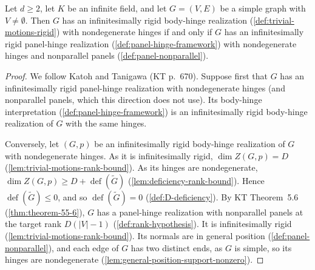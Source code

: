 \begin{theorem}
  \label{thm:molecular-conjecture}
  \leanok
  Let $d \ge 2$, let $K$ be an infinite field, and let $G = (V, E)$ be a
  simple graph with $V \neq \emptyset$. Then $G$ has an infinitesimally
  rigid body-hinge realization (\cref{def:trivial-motions-rigid}) with
  nondegenerate hinges if and only if $G$ has an infinitesimally rigid
  panel-hinge realization (\cref{def:panel-hinge-framework}) with
  nondegenerate hinges and nonparallel panels
  (\cref{def:panel-nonparallel}).
\end{theorem}
\begin{proof}
  \leanok
  We follow Katoh and Tanigawa (KT p.~670). Suppose first that $G$ has an
  infinitesimally rigid panel-hinge realization with nondegenerate hinges
  (and nonparallel panels, which this direction does not use).
  Its body-hinge interpretation (\cref{def:panel-hinge-framework}) is an
  infinitesimally rigid body-hinge realization of $G$ with the same
  hinges.

  Conversely, let $(G, p)$ be an infinitesimally rigid body-hinge
  realization of $G$ with nondegenerate hinges. As it is infinitesimally
  rigid, $\dim Z(G, p) = D$ (\cref{lem:trivial-motions-rank-bound}). As
  its hinges are nondegenerate,
  $\dim Z(G, p) \ge D + \operatorname{def}(\tilde G)$
  (\cref{lem:deficiency-rank-bound}). Hence
  $\operatorname{def}(\tilde G) \le 0$, and so
  $\operatorname{def}(\tilde G) = 0$ (\cref{def:D-deficiency}). By KT
  Theorem~5.6 (\cref{thm:theorem-55-6}), $G$ has a panel-hinge
  realization with nonparallel panels at the target rank $D(|V| - 1)$
  (\cref{def:rank-hypothesis}). It is infinitesimally rigid
  (\cref{lem:trivial-motions-rank-bound}). Its normals are in general
  position (\cref{def:panel-nonparallel}), and each edge of $G$ has two
  distinct ends, as $G$ is simple, so its hinges are nondegenerate
  (\cref{lem:general-position-support-nonzero}).
\end{proof}

